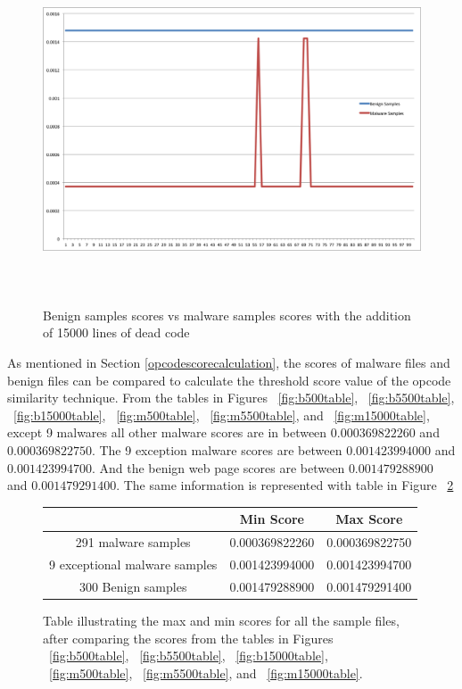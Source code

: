 \begin{figure}[h]
    \centering    
    \includegraphics[width=16cm, height=10.30cm]{15000.png}
    \caption[Benign Samples vs Malware Samples]{Benign samples scores vs malware samples scores with the addition of 15000 lines of dead code}
    \label{fig:bvsm15000}
\end{figure}

As mentioned in Section \ref{opcodescorecalculation}, the scores of malware files and benign files can be compared to calculate the threshold score value of the opcode similarity technique. From the tables in Figures ~\ref{fig:b500table}, ~\ref{fig:b5500table}, ~\ref{fig:b15000table}, ~\ref{fig:m500table}, ~\ref{fig:m5500table}, and ~\ref{fig:m15000table}, except 9 malwares all other malware scores are in between $0.000369822260$ and $0.000369822750$. The 9 exception malware scores are between $0.001423994000$ and $0.001423994700$. And the benign web page scores are between $0.001479288900$ and $0.001479291400$. The same information is represented with table in Figure ~\ref{fig:scoresummarytable}


\begin{figure}[h]
  \centering
  \begin{tabular}{|c|c|c|} 
  \midrule
 & Min Score& Max Score\\
\midrule
291 malware samples & 0.000369822260 & 0.000369822750\\ 
 \midrule 
9 exceptional malware samples & 0.001423994000 & 0.001423994700\\ 
 \midrule 
300 Benign samples &0.001479288900 & 0.001479291400 \\
 \midrule 
\end{tabular}
    \caption[Summary of max and min Scores]{Table illustrating the max and min scores for all the sample files, after comparing the scores from the tables in Figures ~\ref{fig:b500table}, ~\ref{fig:b5500table}, ~\ref{fig:b15000table}, ~\ref{fig:m500table}, ~\ref{fig:m5500table}, and ~\ref{fig:m15000table}. }
    \label{fig:scoresummarytable}
\end{figure}

